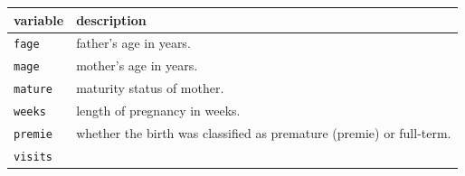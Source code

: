 \documentclass[]{article}
\begin{document}
\begin{longtable}[]{@{}ll@{}}
\toprule
\begin{minipage}[b]{0.22\columnwidth}\raggedright\strut
variable\strut
\end{minipage} & \begin{minipage}[b]{0.16\columnwidth}\raggedright\strut
description\strut
\end{minipage}\tabularnewline
\midrule
\endhead
\begin{minipage}[t]{0.22\columnwidth}\raggedright\strut
\texttt{fage}\strut
\end{minipage} & \begin{minipage}[t]{0.16\columnwidth}\raggedright\strut
father's age in years.\strut
\end{minipage}\tabularnewline
\begin{minipage}[t]{0.22\columnwidth}\raggedright\strut
\texttt{mage}\strut
\end{minipage} & \begin{minipage}[t]{0.16\columnwidth}\raggedright\strut
mother's age in years.\strut
\end{minipage}\tabularnewline
\begin{minipage}[t]{0.22\columnwidth}\raggedright\strut
\texttt{mature}\strut
\end{minipage} & \begin{minipage}[t]{0.16\columnwidth}\raggedright\strut
maturity status of mother.\strut
\end{minipage}\tabularnewline
\begin{minipage}[t]{0.22\columnwidth}\raggedright\strut
\texttt{weeks}\strut
\end{minipage} & \begin{minipage}[t]{0.16\columnwidth}\raggedright\strut
length of pregnancy in weeks.\strut
\end{minipage}\tabularnewline
\begin{minipage}[t]{0.22\columnwidth}\raggedright\strut
\texttt{premie}\strut
\end{minipage} & \begin{minipage}[t]{0.16\columnwidth}\raggedright\strut
whether the birth was classified as premature (premie) or
full-term.\strut
\end{minipage}\tabularnewline
\begin{minipage}[t]{0.22\columnwidth}\raggedright\strut
\texttt{visits}\strut
\end{minipage} & \begin{minipage}[t]{0.16\columnwidth}\raggedright\strut

\end{minipage}
\end{longtable}
\end{document}

